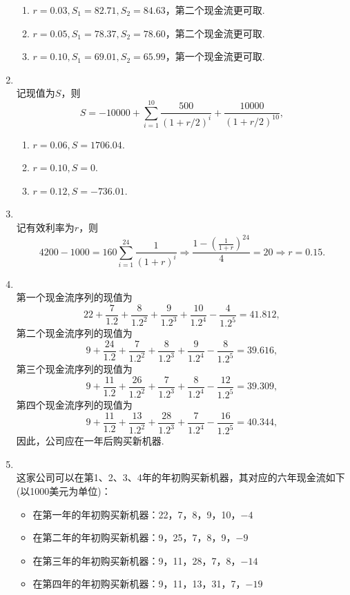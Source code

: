 \begin{enumerate}[label=\arabic{section}.\arabic*]
    \begin{enumerate}[label=\alph*)]
        \item $r=0.03,S_1=82.71, S_2 = 84.63$，第二个现金流更可取.
        \item $r=0.05,S_1=78.37, S_2 = 78.60$，第二个现金流更可取.
        \item $r=0.10,S_1=69.01, S_2 = 65.99$，第一个现金流更可取.
    \end{enumerate}
    \item \sol\\
    记现值为$S$，则\[S=-10000+\sum_{i=1}^{10}\frac{500}{(1+r/2)^i}+\frac{10000}{(1+r/2)^{10}},\]
    \begin{enumerate}[label=\alph*)]
        \item $r = 0.06, S = 1706.04$.
        \item $r = 0.10, S = 0$.
        \item $r = 0.12, S = -736.01$.
    \end{enumerate}
    \item \sol\\
    记有效利率为$r$，则
    \[4200-1000=160\sum_{i=1}^{24}\frac{1}{(1+r)^i} \Rightarrow \frac{1-\left(\frac{1}{1+r}\right)^{24}}{4}=20 \Rightarrow r=0.15.\]
    \item \sol\\
    第一个现金流序列的现值为
    \[22+\frac{7}{1.2}+\frac{8}{1.2^2}+\frac{9}{1.2^3}+\frac{10}{1.2^4}-\frac{4}{1.2^5}=41.812,\]
    第二个现金流序列的现值为
    \[9+\frac{24}{1.2}+\frac{7}{1.2^2}+\frac{8}{1.2^3}+\frac{9}{1.2^4}-\frac{8}{1.2^5}=39.616,\]
    第三个现金流序列的现值为
    \[9+\frac{11}{1.2}+\frac{26}{1.2^2}+\frac{7}{1.2^3}+\frac{8}{1.2^4}-\frac{12}{1.2^5}=39.309,\]
    第四个现金流序列的现值为
    \[9+\frac{11}{1.2}+\frac{13}{1.2^2}+\frac{28}{1.2^3}+\frac{7}{1.2^4}-\frac{16}{1.2^5}=40.344,\]
    因此，公司应在一年后购买新机器.
    \item \sol\\
    这家公司可以在第1、2、3、4年的年初购买新机器，其对应的六年现金流如下(以1000美元为单位)：
    \begin{itemize}
        \item 在第一年的年初购买新机器：22，7，8，9，10，$-4$
        \item 在第二年的年初购买新机器：9，25，7，8，9，$-9$
        \item 在第三年的年初购买新机器：9，11，28，7，8，$-14$
        \item 在第四年的年初购买新机器：9，11，13，31，7，$-19$
    \end{itemize}

\end{enumerate}
